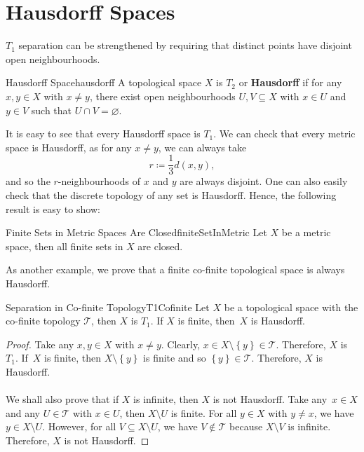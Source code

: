 \documentclass[math]{amznotes}
\theoremstyle{remark}
\begin{document}
\section{Hausdorff Spaces}
$T_1$ separation can be strengthened by requiring that distinct points have disjoint open neighbourhoods.
\begin{dfnbox}{Hausdorff Space}{hausdorff}
    A topological space $X$ is {\color{red} \textbf{$T_2$}} or {\color{red} \textbf{Hausdorff}} if for any $x, y \in X$ with $x \neq y$, there exist open neighbourhoods $U, V \subseteq X$ with $x \in U$ and $y \in V$ such that $U \cap V = \varnothing$.
\end{dfnbox}
It is easy to see that every Hausdorff space is $T_1$. We can check that every metric space is Hausdorff, as for any $x \neq y$, we can always take 
\begin{equation*}
    r \coloneqq \frac{1}{3}d\left(x, y\right),
\end{equation*}
and so the $r$-neighbourhoods of $x$ and $y$ are always disjoint. One can also easily check that the discrete topology of any set is Hausdorff. Hence, the following result is easy to show:
\begin{probox}{Finite Sets in Metric Spaces Are Closed}{finiteSetInMetric}
    Let $X$ be a metric space, then all finite sets in $X$ are closed.
\end{probox}
As another example, we prove that a finite co-finite topological space is always Hausdorff.
\begin{probox}{Separation in Co-finite Topology}{T1Cofinite}
    Let $X$ be a topological space with the co-finite topology $\mathcal{T}$, then $X$ is $T_1$. If $X$ is finite, then~$X$ is Hausdorff.
    \tcblower
    \begin{proof}
        Take any $x, y \in X$ with $x \neq y$. Clearly, $x \in X \setminus \left\{y\right\} \in \mathcal{T}$. Therefore, $X$ is $T_1$. If~$X$ is finite, then $X \setminus \left\{y\right\}$ is finite and so $\left\{y\right\} \in \mathcal{T}$. Therefore, $X$ is Hausdorff.
        \\\\
        We shall also prove that if $X$ is infinite, then $X$ is not Hausdorff. Take any~$x \in X$ and any $U \in \mathcal{T}$ with $x \in U$, then $X \setminus U$ is finite. For all $y \in X$ with $y \neq x$, we have~$y \in X \setminus U$. However, for all $V \subseteq X \setminus U$, we have $V \notin \mathcal{T}$ because $X \setminus V$ is infinite. Therefore, $X$ is not Hausdorff.
    \end{proof}
\end{probox}
\end{document}
